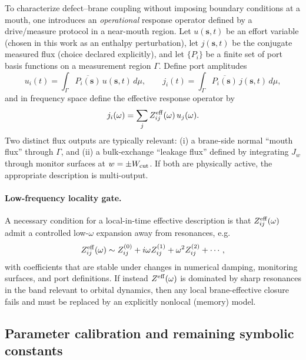\documentclass[11pt]{article}
\begin{document}
To characterize defect--brane coupling without imposing boundary conditions at a mouth, one introduces an
\emph{operational} response operator defined by a drive/measure protocol in a near-mouth region. Let
$u(\mathbf s,t)$ be an effort variable (chosen in this work as an enthalpy perturbation),
let $j(\mathbf s,t)$ be the conjugate measured flux (choice declared explicitly), and let $\{P_i\}$ be a
finite set of port basis functions on a measurement region $\Gamma$. Define port amplitudes
\begin{equation}
  u_i(t)=\int_{\Gamma}\overline{P_i(\mathbf s)}\,u(\mathbf s,t)\,d\mu,
  \qquad
  j_i(t)=\int_{\Gamma}\overline{P_i(\mathbf s)}\,j(\mathbf s,t)\,d\mu,
  \label{eq:ports_def}
\end{equation}
and in frequency space define the effective response operator by
\begin{equation}
  j_i(\omega) = \sum_j Z^{\rm eff}_{ij}(\omega)\,u_j(\omega).
  \label{eq:Zeff_def}
\end{equation}
Two distinct flux outputs are typically relevant:
(i) a brane-side normal ``mouth flux'' through $\Gamma$, and
(ii) a bulk-exchange ``leakage flux'' defined by integrating $J_w$ through monitor surfaces at $w=\pm W_{\rm cut}$.
If both are physically active, the appropriate description is multi-output.

\paragraph{Low-frequency locality gate.}
A necessary condition for a local-in-time effective description is that $Z^{\rm eff}_{ij}(\omega)$ admit a
controlled low-$\omega$ expansion away from resonances, e.g.
\begin{equation}
  Z^{\rm eff}_{ij}(\omega) \sim Z^{(0)}_{ij} + i\omega Z^{(1)}_{ij} + \omega^2 Z^{(2)}_{ij} + \cdots,
  \label{eq:Zeff_expansion}
\end{equation}
with coefficients that are stable under changes in numerical damping, monitoring surfaces, and port definitions.
If instead $Z^{\rm eff}(\omega)$ is dominated by sharp resonances in the band relevant to orbital dynamics,
then any local brane-effective closure fails and must be replaced by an explicitly nonlocal (memory) model.

\subsection{Parameter calibration and remaining symbolic constants}
\label{sec:undetermined:calibration}
\end{document}
